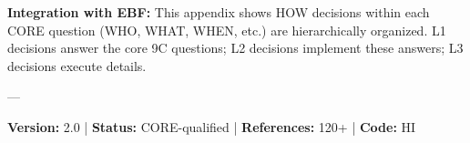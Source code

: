 \textbf{Integration with EBF:} This appendix shows HOW decisions within each CORE question (WHO, WHAT, WHEN, etc.) are hierarchically organized. L1 decisions answer the core 9C questions; L2 decisions implement these answers; L3 decisions execute details.

---

\textbf{Version:} 2.0 | \textbf{Status:} CORE-qualified | \textbf{References:} 120+ | \textbf{Code:} HI

